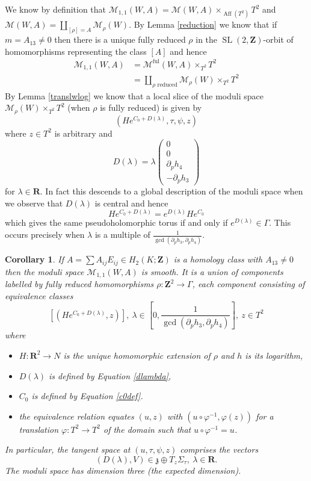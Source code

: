\documentclass[11pt]{amsart}
\newcommand{\mM}{\mathcal{M}}
\newcommand{\RR}{\mathbf{R}}
\newcommand{\ZZ}{\mathbf{Z}}
\newcommand{\WW}{W}
\newcommand{\zz}{\mathfrak{z}}
\renewcommand{\phi}{\varphi}
\newcommand{\OP}{\operatorname}
\numberwithin{equation}{section}
\newtheorem{cor}[equation]{Corollary}
\theoremstyle{definition}
\theoremstyle{remark}
\begin{document}
We know by definition that $\mM_{1,1}(\WW,A)=\mM(\WW,A)\times_{\OP{Aff}(T^2)}T^2$ and $\mM(\WW,A)=\coprod_{[\rho]=A}\mM_{\rho}(\WW)$. By Lemma \ref{reduction} we know that if $m=A_{13}\neq 0$ then there is a unique fully reduced $\rho$ in the $\OP{SL}(2,\ZZ)$-orbit of homomorphisms representing the class $[A]$ and hence
\begin{align*}
\mM_{1,1}(\WW,A)&=\mM^{\mathrm{ful}}(\WW,A)\times_{T^2}T^2\\
&=\coprod_{\rho\mbox{ reduced}}\mM_{\rho}(\WW)\times_{T^2}T^2
\end{align*}
By Lemma \ref{translwlog} we know that a local slice of the moduli space $\mM_{\rho}(\WW)\times_{T^2}T^2$ (when $\rho$ is fully reduced) is given by
\[(He^{C_0+D(\lambda)},\tau,\psi,z)\]
where $z\in T^2$ is arbitrary and
\begin{equation}\label{dlambda}
D(\lambda)=\lambda\left(\begin{array}{c}
0\\
0\\
\partial_ph_4\\
-\partial_ph_3
\end{array}\right)\end{equation}
for $\lambda\in\RR$. In fact this descends to a global description of the moduli space when we observe that $D(\lambda)$ is central and hence
\[He^{C_0+D(\lambda)}=e^{D(\lambda)}He^{C_0}\]
which gives the same pseudoholomorphic torus if and only if $e^{D(\lambda)}\in\Gamma$. This occurs precisely when $\lambda$ is a multiple of $\frac{1}{\gcd(\partial_ph_3,\partial_ph_4)}$.

\begin{cor}\label{mod-tang}
If $A=\sum A_{ij}E_{ij}\in H_2(K;\ZZ)$ is a homology class with $A_{13}\neq 0$ then the moduli space $\mM_{1,1}(\WW,A)$ is smooth. It is a union of components labelled by fully reduced homomorphisms $\rho\colon\ZZ^2\to\Gamma$, each component consisting of equivalence classes
\[\left[\left(He^{C_0+D(\lambda)},z\right)\right],\ \lambda\in\left[0,\frac{1}{\gcd(\partial_ph_3,\partial_ph_4)}\right],\ z\in T^2\]
where
\begin{itemize}
\item $H\colon\RR^2\to N$ is the unique homomorphic extension of $\rho$ and $h$ is its logarithm,
\item $D(\lambda)$ is defined by Equation \eqref{dlambda},
\item $C_0$ is defined by Equation \eqref{c0def}.
\item the equivalence relation equates $(u,z)$ with $(u\circ\phi^{-1},\phi(z))$ for a translation $\phi\colon T^2\to T^2$ of the domain such that $u\circ\phi^{-1}=u$.
\end{itemize}
In particular, the tangent space at $(u,\tau,\psi,z)$ comprises the vectors
\[(D(\lambda),V)\in\zz\oplus T_z\Sigma_{\tau},\ \lambda\in\RR.\]
The moduli space has dimension three (the expected dimension).
\end{cor}
\end{document}
